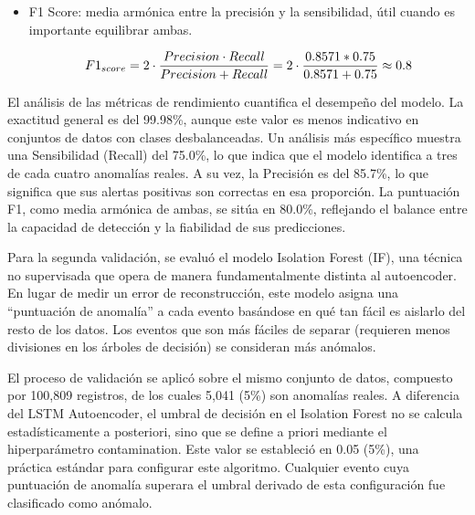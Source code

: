\begin{itemize}
      \item F1 Score: media armónica entre la precisión y la sensibilidad, útil cuando es importante equilibrar ambas.

            \begin{align}
                  F1_{score} = 2 \cdot \frac{Precision \cdot Recall}{Precision + Recall} = 2 \cdot \frac{0.8571 * 0.75}{0.8571+0.75} \approx 0.8 \notag \\
                  \label{eq:f1score}
            \end{align}

\end{itemize}

El análisis de las métricas de rendimiento cuantifica el desempeño del modelo. La exactitud general es del 99.98\%, aunque este valor es menos indicativo en conjuntos de datos con clases desbalanceadas. Un análisis más específico muestra una Sensibilidad (Recall) del 75.0\%, lo que indica que el modelo identifica a tres de cada cuatro anomalías reales. A su vez, la Precisión es del 85.7\%, lo que significa que sus alertas positivas son correctas en esa proporción. La puntuación F1, como media armónica de ambas, se sitúa en 80.0\%, reflejando el balance entre la capacidad de detección y la fiabilidad de sus predicciones.


Para la segunda validación, se evaluó el modelo Isolation Forest (IF), una técnica no supervisada que opera de manera fundamentalmente distinta al autoencoder. En lugar de medir un error de reconstrucción, este modelo asigna una ``puntuación de anomalía'' a cada evento basándose en qué tan fácil es aislarlo del resto de los datos. Los eventos que son más fáciles de separar (requieren menos divisiones en los árboles de decisión) se consideran más anómalos.

El proceso de validación se aplicó sobre el mismo conjunto de datos, compuesto por 100,809 registros, de los cuales 5,041 (5\%) son anomalías reales. A diferencia del LSTM Autoencoder, el umbral de decisión en el Isolation Forest no se calcula estadísticamente a posteriori, sino que se define a priori mediante el hiperparámetro contamination. Este valor se estableció en 0.05 (5\%), una práctica estándar para configurar este algoritmo. Cualquier evento cuya puntuación de anomalía superara el umbral derivado de esta configuración fue clasificado como anómalo.

